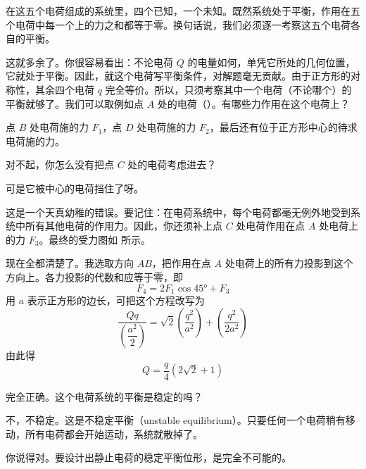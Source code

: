 \begin{dialogue}
\stda 在这五个电荷组成的系统里，四个已知，一个未知。既然系统处于平衡，作用在五个电荷中每一个上的力之和都等于零。换句话说，我们必须逐一考察这五个电荷各自的平衡。

\tchr 这就多余了。你很容易看出：不论电荷 $Q$ 的电量如何，单凭它所处的几何位置，它就处于平衡。因此，就这个电荷写平衡条件，对解题毫无贡献。由于正方形的对称性，其余四个电荷 $q$ 完全等价。所以，只须考察其中一个电荷（不论哪个）的平衡就够了。我们可以取例如点 $A$ 处的电荷（）。有哪些力作用在这个电荷上？

\stda 点 $B$ 处电荷施的力 $F_{1}$，点 $D$ 处电荷施的力 $F_{2}$，最后还有位于正方形中心的待求电荷施的力。

\tchr 对不起，你怎么没有把点 $C$ 处的电荷考虑进去？

\stda 可是它被中心的电荷挡住了呀。

\tchr 这是一个天真幼稚的错误。要记住：在电荷系统中，每个电荷都毫无例外地受到系统中所有其他电荷的作用力。因此，你还须补上点 $C$ 处电荷作用在点 $A$ 处电荷上的力 $F_{3}$。最终的受力图如 所示。

\stda 现在全都清楚了。我选取方向 $AB$，把作用在点 $A$ 处电荷上的所有力投影到这个方向上。各力投影的代数和应等于零，即
\begin{equation*}%
F_{4} = 2F_{1} \cos \ang{45} + F_{3}
\end{equation*}
用 $a$ 表示正方形的边长，可把这个方程改写为
\begin{equation*}%
\frac{Qq}{\left( \dfrac{a^{2}}{2} \right)} = \sqrt{2} \left( \frac{q^{2}}{a^{2}} \right)+ \left( \frac{q^{2}}{2a^{2}} \right)
\end{equation*}
由此得
\begin{equation}%
Q = \frac{q}{4} \left( 2\sqrt{2} + 1 \right)
\label{eq-159}
\end{equation}

\tchr 完全正确。这个电荷系统的平衡是稳定的吗？

\stdb 不，不稳定。这是不稳定平衡（unstable equilibrium）。只要任何一个电荷稍有移动，所有电荷都会开始运动，系统就散掉了。

\tchr 你说得对。要设计出静止电荷的稳定平衡位形，是完全不可能的。


\end{dialogue}
